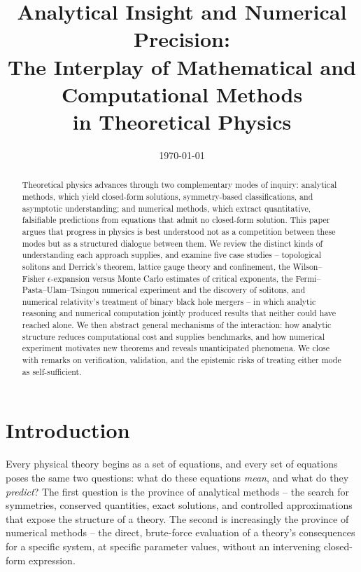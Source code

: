 \documentclass[11pt]{article}
\title{\Large Analytical Insight and Numerical Precision:\\
The Interplay of Mathematical and Computational Methods\\ in Theoretical Physics}
\author{}
\date{\today}
\begin{document}
\maketitle
\vspace{-1.5em}

\begin{abstract}
\noindent Theoretical physics advances through two complementary modes of inquiry: analytical methods, which yield closed-form solutions, symmetry-based classifications, and asymptotic understanding; and numerical methods, which extract quantitative, falsifiable predictions from equations that admit no closed-form solution. This paper argues that progress in physics is best understood not as a competition between these modes but as a structured dialogue between them. We review the distinct kinds of understanding each approach supplies, and examine five case studies -- topological solitons and Derrick's theorem, lattice gauge theory and confinement, the Wilson--Fisher $\epsilon$-expansion versus Monte Carlo estimates of critical exponents, the Fermi--Pasta--Ulam--Tsingou numerical experiment and the discovery of solitons, and numerical relativity's treatment of binary black hole mergers -- in which analytic reasoning and numerical computation jointly produced results that neither could have reached alone. We then abstract general mechanisms of the interaction: how analytic structure reduces computational cost and supplies benchmarks, and how numerical experiment motivates new theorems and reveals unanticipated phenomena. We close with remarks on verification, validation, and the epistemic risks of treating either mode as self-sufficient.
\end{abstract}

\section{Introduction}

Every physical theory begins as a set of equations, and every set of equations poses the same two questions: what do these equations \emph{mean}, and what do they \emph{predict}? The first question is the province of analytical methods -- the search for symmetries, conserved quantities, exact solutions, and controlled approximations that expose the structure of a theory. The second is increasingly the province of numerical methods -- the direct, brute-force evaluation of a theory's consequences for a specific system, at specific parameter values, without an intervening closed-form expression.
\end{document}

